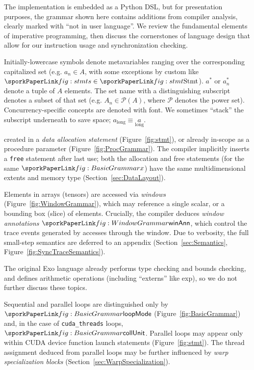 \FloatBarrier


The \sporkName{} implementation is embedded as a Python DSL,
but for presentation purposes,
the grammar shown here contains additions from compiler analysis,
clearly marked with ``not in user language''.
We review the fundamental elements of imperative programming,
then discuss the cornerstones of \sporkName{} language design that allow for our instruction usage and synchronization checking.

Initially-lowercase symbols denote metavariables ranging over the corresponding capitalized set
(e.g. $a_n \in A$, with some exceptions by custom like $\sporks \in \sporkStmt$).
$a^*$ or $a_n^*$ denote a tuple of $A$ elements.
The set name with a distinguishing subscript denotes a subset of that set
(e.g. $A_n \in \mathcal{P}(A)$, where $\mathcal{P}$ denotes the power set).
Concurrency-specific concepts are denoted with  font.
We sometimes ``stack'' the subscript underneath to save space; $a_\mathrm{long} \equiv \underset{\mathrm{long}}{a}$.





created in a \emph{data allocation statement} (Figure~\ref{fig:stmt}),
or already in-scope as a procedure parameter (Figure~\ref{fig:ProcGrammar}).
The compiler implicitly inserts a \texttt{free} statement after last use;
both the allocation and free statements (for the same $\sporkx$)
have the same multidimensional extents and memory type (Section~\ref{sec:DataLayout}).

Elements in arrays (tensors) are accessed via \emph{windows} (Figure~\ref{fig:WindowGrammar}),
which may reference a single scalar, or a bounding box (slice) of elements.
Crucially, the compiler deduces \emph{window annotations} $\sporkwinAnn$,
which control the trace events generated by accesses through the window.
Due to verbosity, the full small-step semantics are deferred to an appendix
(Section~\ref{sec:Semantics}, Figure~\ref{fig:SyncTraceSemantics}).

The original Exo language already performs type checking and bounds checking,
and defines arithmetic operations (including ``externs'' like exp),
so we do not further discuss these topics.

 Sequential and parallel loops are distinguished only by $\sporkloopMode$
(Figure~\ref{fig:BasicGrammar})
and, in the case of \texttt{cuda\_threads} loops, $\sporkcollUnit$.
Parallel loops may appear only within CUDA device function launch statements (Figure~\ref{fig:stmt}).
The thread assignment deduced from parallel loops may be further influenced by \emph{warp specialization blocks} (Section~\ref{sec:WarpSpecialization}).

